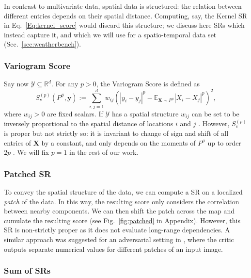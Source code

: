 \documentclass[twoside,11pt]{article}
\newcommand{\E}{\mathbb{E}}
\newcommand{\R}{\mathbb{R}}
\newcommand{\ddobs}{\mathbf{y}}
\newcommand{\Ddsim}{\mathbf{X}}
\newcommand{\Sv}{S_{\operatorname{v}}}
\begin{document}
	
	In contrast to multivariate data, spatial data is structured: the relation between different entries depends on their spatial distance. Computing, say, the Kernel SR in Eq.~\eqref{Eq:kernel_score} would discard this structure; we discuss here SRs which instead capture it, and which we will use for a spatio-temporal data set (Sec.~\ref{sec:weatherbench}). 
	
	
	\subsubsection{Variogram Score}
	Say now $ \mathcal{Y}\subseteq \R^d $. For any $ p>0 $, the Variogram Score \cite{scheuerer2015variogram} is defined as
	\begin{equation}\label{Eq:var_score}
	\Sv^{(p)}(P^\phi, \ddobs):=\sum_{i, j=1}^{d} w_{i j}\left(\left|y_{i}-y_{j}\right|^{p}-\E_{\Ddsim\sim P^\phi}\left|X_{i}-X_{j}\right|^{p}\right)^{2}, \end{equation}
	where 
	$w_{ij}>0$ are fixed scalars. If $ \mathcal Y $ has a spatial structure $ w_{ij} $ can be set to be inversely proportional to the spatial distance of locations $ i $ and $ j $ \citep{scheuerer2015variogram}.
	However, $ \Sv^{(p)} $ is proper but not strictly so: it is invariant to change of sign and shift of all entries of $ \Ddsim $ by a constant, and only depends on the moments of $ P^\phi $ up to order $ 2p $ \citep{scheuerer2015variogram}. We will fix $p=1$ in the rest of our work.
	
	\subsubsection{Patched SR}
	
	To convey the spatial structure of the data, we can compute a SR on
	a localized \textit{patch} of the data. In this way, the resulting score only considers the correlation between nearby components. 
	We can then shift the patch across the map and cumulate the resulting score (see Fig.~\ref{fig:patched} in Appendix). However, this SR is non-strictly proper as it does not evaluate long-range dependencies. A similar approach was suggested for an adversarial setting in \citet{isola2017image}, where the critic outputs separate numerical values for different patches of an input image.
	
	
	
	
	
	
	
	\subsubsection{Sum of SRs}
	
\end{document}
